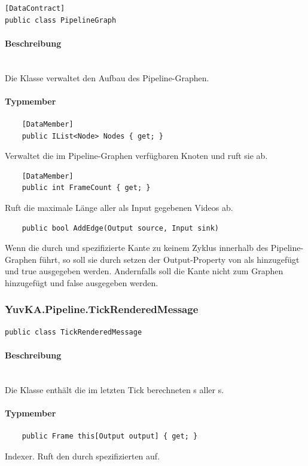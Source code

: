 \begin{verbatim}
[DataContract]
public class PipelineGraph	
\end{verbatim}

\paragraph{Beschreibung}~\\
Die Klasse  verwaltet den Aufbau des Pipeline-Graphen. 
	
\paragraph{Typmember}
\begin{itemize}

	\begin{verbatim}
	[DataMember]
	public IList<Node> Nodes { get; }
	\end{verbatim}
	Verwaltet die im Pipeline-Graphen verfügbaren Knoten und ruft sie ab.

	\begin{verbatim}
	[DataMember]
	public int FrameCount { get; }
	\end{verbatim}
	Ruft die maximale Länge aller als Input gegebenen Videos ab.


	
	\begin{verbatim}
	public bool AddEdge(Output source, Input sink)
	\end{verbatim}
	Wenn die durch  und  spezifizierte Kante zu keinem Zyklus innerhalb des Pipeline-Graphen führt, so soll sie durch setzen der Output-Property von  als  hinzugefügt und true ausgegeben werden. Andernfalls soll die Kante nicht zum Graphen hinzugefügt und false ausgegeben werden.
\end{itemize}
	
\subsubsection{YuvKA.Pipeline.TickRenderedMessage}
		
\begin{verbatim}
public class TickRenderedMessage
\end{verbatim}

\paragraph{Beschreibung}~\\
Die Klasse  enthält die im letzten Tick berechneten s aller s.

\paragraph{Typmember}
\begin{itemize}
	
	\begin{verbatim}
	public Frame this[Output output] { get; }
	\end{verbatim}
Indexer. Ruft den durch  spezifizierten  auf.

\end{itemize}




	


